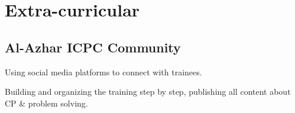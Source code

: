 \documentclass[]{deedy-resume-openfont}
\begin{document}
\begin{minipage}[t]{0.33\textwidth}
\section{Extra-curricular}
\subsection{Al-Azhar ICPC Community}
\begin{tightemize}
    \item Using social media platforms to connect with trainees.\\
    \item Building and organizing the training step by step, publishing all content about CP \& problem solving.
\end{tightemize}
\sectionsep


%
%

\end{minipage} 
\hfill
\end{document}
